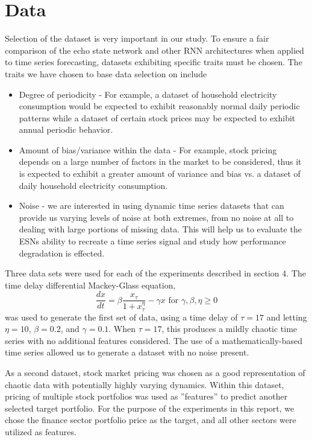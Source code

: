 \documentclass{acm_proc_article-sp}
\begin{document}
\section{Data}
Selection of the dataset is very important in our study. To ensure a fair comparison of the echo state network and other RNN architectures when applied to time series forecasting, datasets exhibiting specific traits must be chosen. The traits we have chosen to base data selection on include
\begin{itemize}
\item Degree of periodicity - For example, a dataset of household electricity consumption would be expected to exhibit reasonably normal daily periodic patterns while a dataset of certain stock prices may be expected to exhibit annual periodic behavior.
\item Amount of bias/variance within the data - For example, stock pricing depends on a large number of factors in the market to be considered, thus it is expected to exhibit a greater amount of variance and bias vs. a dataset of daily household electricity consumption.
\item Noise - we are interested in using dynamic time series datasets that can provide us varying levels of noise at both extremes, from no noise at all to dealing with large portions of missing data. This will help us to evaluate the ESNs ability to recreate a time series signal and study how performance degradation is effected.
\end{itemize}
Three data sets were used for each of the experiments described in section 4. The time delay differential Mackey-Glass equation,
\begin{equation*}
\frac{dx}{dt} = \beta \frac{x_\tau}{1+x_{\tau}^\eta} - \gamma x \text{  for  } \gamma, \beta, \eta \ge 0
\end{equation*}
was used to generate the first set of data, using a time delay of $\tau = 17$ and letting $\eta = 10$, $\beta = 0.2$, and $\gamma = 0.1$. When $\tau = 17$, this produces a mildly chaotic time series with no additional features considered. The use of a mathematically-based time series allowed us to generate a dataset with no noise present.

As a second dataset, stock market pricing \cite{industryportfolio} was chosen as a good representation of chaotic data with potentially highly varying dynamics. Within this dataset, pricing of multiple stock portfolios was used as ''features'' to predict another selected target portfolio. For the purpose of the experiments in this report, we chose the finance sector portfolio price as the target, and all other sectors were utilized as features.
\end{document}
